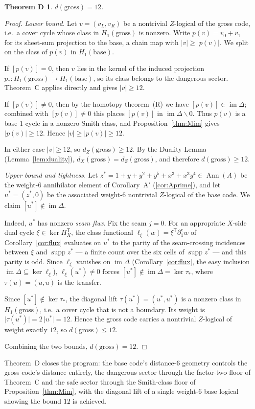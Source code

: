 \documentclass[11pt]{article}
\newcommand{\wt}[1]{\lvert #1\rvert}
\DeclareMathOperator{\Ann}{Ann}
\DeclareMathOperator{\img}{im}
\DeclareMathOperator{\supp}{supp}
\newcommand{\cmap}{\Delta}                       %
\theoremstyle{plain}
\newtheorem*{thmD}{Theorem D}
\theoremstyle{definition}
\theoremstyle{remark}
\begin{document}
\begin{thmD}
$d(\mathrm{gross})=12$.
\end{thmD}

\begin{proof}
\emph{Lower bound.} Let $v=(v_L,v_R)$ be a nontrivial $Z$-logical of the gross code,
i.e.\ a cover cycle whose class in $H_1(\mathrm{gross})$ is nonzero. Write
$p(v)=v_0+v_1$ for its sheet-sum projection to the base, a chain map with
$\wt v\ge\wt{p(v)}$. We split on the class of $p(v)$ in $H_1(\mathrm{base})$.

If $[p(v)]=0$, then $v$ lies in the kernel of the induced projection
$p_\ast\colon H_1(\mathrm{gross})\to H_1(\mathrm{base})$, so its class belongs to the
dangerous sector. Theorem~C applies directly and gives $\wt v\ge 12$.

If $[p(v)]\ne 0$, then by the homotopy theorem~(R) we have
$[p(v)]\in\img\cmap$; combined with $[p(v)]\ne 0$ this places $[p(v)]$ in
$\img\cmap\smallsetminus 0$. Thus $p(v)$ is a base $1$-cycle in a nonzero Smith class,
and Proposition~\ref{thm:Mim} gives $\wt{p(v)}\ge 12$. Hence
$\wt v\ge\wt{p(v)}\ge 12$.

In either case $\wt v\ge 12$, so $d_Z(\mathrm{gross})\ge 12$. By the Duality Lemma
(Lemma~\ref{lem:duality}), $d_X(\mathrm{gross})=d_Z(\mathrm{gross})$, and therefore
$d(\mathrm{gross})\ge 12$.

\emph{Upper bound and tightness.} Let
$z^\ast=1+y+y^2+y^5+x^3+x^3y^4\in\Ann(A)$ be the weight-$6$ annihilator element of
Corollary~A$'$ (\ref{cor:Aprime}), and let $u^\ast=(z^\ast,0)$ be the associated
weight-$6$ nontrivial $Z$-logical of the base code. We claim
$[u^\ast]\notin\img\cmap$.

Indeed, $u^\ast$ has nonzero \emph{seam flux}. Fix the seam $j=0$. For an appropriate
$X$-side dual cycle $\xi\in\ker H_X^{\mathsf T}$, the class functional
$\ell_\xi(w)=\xi^{\mathsf T}\partial_1^{\mathrm c}w$ of Corollary~\ref{cor:flux} evaluates on
$u^\ast$ to the parity of the seam-crossing incidences between $\xi$ and $\supp z^\ast$ --- a
finite count over the six cells of $\supp z^\ast$ --- and this parity is odd. Since $\ell_\xi$
vanishes on $\img\cmap$ (Corollary~\ref{cor:flux}, the easy inclusion
$\img\cmap\subseteq\ker\ell_\xi$), $\ell_\xi(u^\ast)\ne 0$ forces
$[u^\ast]\notin\img\cmap=\ker\tau_\ast$, where $\tau(u)=(u,u)$ is the transfer.

Since $[u^\ast]\notin\ker\tau_\ast$, the diagonal lift $\tau(u^\ast)=(u^\ast,u^\ast)$
is a nonzero class in $H_1(\mathrm{gross})$, i.e.\ a cover cycle that is not a
boundary. Its weight is $\wt{\tau(u^\ast)}=2\,\wt{u^\ast}=12$. Hence the gross code
carries a nontrivial $Z$-logical of weight exactly $12$, so $d(\mathrm{gross})\le 12$.

Combining the two bounds, $d(\mathrm{gross})=12$.
\end{proof}

Theorem~D closes the program: the base code's distance-$6$ geometry controls the
gross code's distance entirely, the dangerous sector through the factor-two floor of
Theorem~C and the safe sector through the Smith-class floor of
Proposition~\ref{thm:Mim}, with the diagonal lift of a single weight-$6$ base logical
showing the bound $12$ is achieved.
\end{document}
